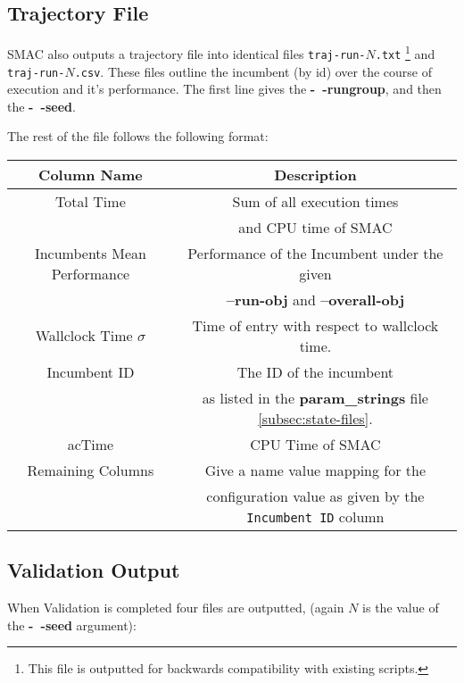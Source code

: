 \documentclass[manual.tex]{subfiles}
\begin{document}
\subsection{Trajectory File}

SMAC also outputs a trajectory file into identical files \texttt{traj-run-$N$.txt} \footnote{This file is outputted for backwards compatibility with existing scripts.} and \texttt{traj-run-$N$.csv}. These files outline the incumbent (by id) over the course of execution and it's performance. The first line gives the 
\textbf{-~$\!\!$-rungroup}, and then the  \textbf{-~$\!\!$-seed}.

The rest of the file follows the following format:

\begin{tabular}{|c|c|}
\hline 
Column Name & Description\tabularnewline
\hline 
\hline 
Total Time & Sum of all execution times \\ & and CPU time of SMAC\tabularnewline
\hline 
Incumbents Mean Performance & Performance of the Incumbent under the given \\ &  \textbf{--run-obj
}and \textbf{--overall-obj}\tabularnewline
\hline 
Wallclock Time $\sigma$ & Time of entry with respect to wallclock time. %
\tabularnewline
\hline 
Incumbent ID & The ID of the incumbent \\ & as listed in the \textbf{param\_strings} file \ref{subsec:state-files}.
\tabularnewline
\hline 
acTime & CPU Time of SMAC\tabularnewline
\hline 
Remaining Columns & Give a name value mapping for the \\& configuration value as given by the \texttt{Incumbent ID} column \tabularnewline
\hline 
\end{tabular}

\subsection{Validation Output}

When Validation is completed four files are outputted, (again $N$ is the value of the \textbf{-~$\!\!$-seed} argument):
\end{document}
